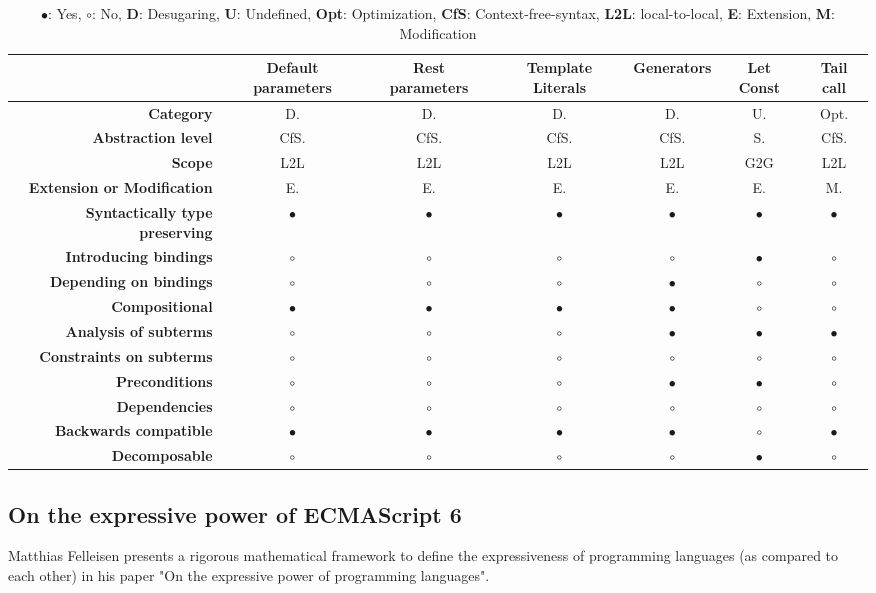 {\begin{landscape}
\begin{table}[h]
\begin{tabular}{rcccccc}
\hline
& {\bf Default parameters} & {\bf Rest parameters} & {\bf Template Literals} & {\bf Generators} & {\bf Let Const} & {\bf Tail call} \\ \hline
{\bf Category} & D. & D. & D. & D. & U. & Opt. \\
{\bf Abstraction level} & CfS. & CfS. & CfS. & CfS. & S. & CfS. \\
{\bf Scope} & L2L & L2L & L2L & L2L & G2G & L2L \\
{\bf Extension or Modification} & E. & E. & E. & E. & E. & M. \\
{\bf Syntactically type preserving} & $\bullet$ & $\bullet$ & $\bullet$ & $\bullet$ & $\bullet$  & $\bullet$      \\
{\bf Introducing bindings} & $\circ$ & $\circ$ & $\circ$ & $\circ$ & $\bullet$ & $\circ$ \\
{\bf Depending on bindings} & $\circ$ & $\circ$ & $\circ$ & $\bullet$ & $\circ$ & $\circ$ \\
{\bf Compositional} & $\bullet$ & $\bullet$ & $\bullet$ & $\bullet$ & $\circ$ & $\circ$ \\
{\bf Analysis of subterms} & $\circ$ & $\circ$ & $\circ$ & $\bullet$ & $\bullet$ & $\bullet$ \\
{\bf Constraints on subterms} & $\circ$ & $\circ$ & $\circ$ & $\circ$ & $\circ$ & $\circ$ \\
{\bf Preconditions} & $\circ$ & $\circ$ & $\circ$ & $\bullet$ & $\bullet$ & $\circ$ \\
{\bf Dependencies} & $\circ$ & $\circ$ & $\circ$ & $\circ$ & $\circ$ & $\circ$ \\
{\bf Backwards compatible} & $\bullet$ & $\bullet$ & $\bullet$ & $\bullet$ & $\circ$ & $\bullet$ \\
{\bf Decomposable} & $\circ$ & $\circ$ & $\circ$ & $\circ$ & $\bullet$ & $\circ$ \\ \hline
\end{tabular}
\caption*{$\bullet$: Yes, $\circ$: No, \textbf{D}: Desugaring, \textbf{U}: Undefined, \textbf{Opt}: Optimization, \textbf{CfS}: Context-free-syntax, \textbf{L2L}: local-to-local, \textbf{E}: Extension, \textbf{M}: Modification}
	\end{table}

		
	\end{landscape}
	\clearpage
}

\subsection{On the expressive power of ECMAScript 6}
Matthias Felleisen presents a rigorous mathematical framework to define the expressiveness of programming languages (as compared to each other) in his paper "On the expressive power of programming languages"\cite{Felleisen1990}. 

